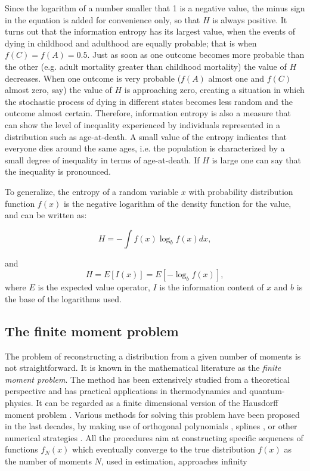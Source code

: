 \documentclass[T0_MEM]{subfiles}
\begin{document}
Since the logarithm of a number smaller that 1 is a negative value, the minus sign in the equation is added for convenience only, so that $H$ is always positive. It turns out that the information entropy has its largest value, when the events of dying in childhood and adulthood are equally probable; that is when $f(C) = f(A) = 0.5$. Just as soon as one outcome becomes more probable than the other (e.g. adult mortality greater than childhood mortality) the value of $H$ decreases. When one outcome is very probable ($f(A)$ almost one and $f(C)$ almost zero, say) the value of $H$ is approaching zero, creating a situation in which the stochastic process of dying in different states becomes less random and the outcome almost certain. Therefore, information entropy is also a measure that can show the level of inequality experienced by individuals represented in a distribution such as age-at-death. A small value of the entropy indicates that everyone dies around the same ages, i.e. the population is characterized by a small degree of inequality in terms of age-at-death. If $H$ is large one can say that the inequality is pronounced.

To generalize, the entropy of a random variable $x$ with probability distribution function $f(x)$ is the negative logarithm of the density function for the value, and can be written as:

\begin{equation}\label{eq:Entropy}
H = -\int f(x)\log_b f(x)dx,
\end{equation}

and
\begin{equation}\label{eq:entropy}
H = E\left[ I(x)\right] = E\left[ -\log_b f(x)\right],
\end{equation}
where $E$ is the expected value operator, $I$ is the information content of $x$ and $b$ is the base of the logarithms used.

\subsection{The finite moment problem}\label{sec:MaxEnt}

The problem of reconstructing a distribution from a given number of moments is not straightforward. It is known in the mathematical literature as the \emph{finite moment problem}. The method has been extensively studied from a theoretical perspective and has practical applications in thermodynamics and quantum-physics. It can be regarded as a finite dimensional version of the Hausdorff moment problem \citep{hausdorff1921, shohat1943}. Various methods for solving this problem have been proposed in the last decades, by making use of orthogonal polynomials \citep{chihara1978}, splines \citep{john2007}, or other numerical strategies \citep{frontini1990}. All the procedures aim at constructing specific sequences of functions $f_N(x)$ which eventually converge to the true distribution $f(x)$ as the number of moments $N$, used in estimation, approaches infinity
\end{document}
